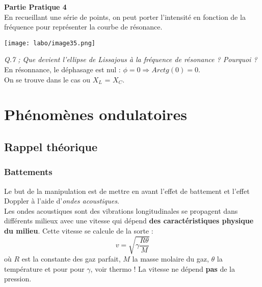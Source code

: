 \documentclass[british,french,11pt, a4paper, openany]{book}
\begin{document}
		\textbf{Partie Pratique 4}\\
		En recueillant une série de points, on peut porter l'intensité en fonction de la fréquence pour représenter la courbe de résonance.
		\begin{center}
			\texttt{[image: labo/image35.png]}
		\end{center}
		\textit{Q.7 ; Que devient l'ellipse de Lissajous à la fréquence de résonance ? Pourquoi ?}\\
		En résonnance, le déphasage est nul : $\phi = 0 \Rightarrow Arctg(0) = 0$.\\
		On se trouve dans le cas ou $X_L$ = $X_C$.
		
		
		
		
		
		
		
		
		
		
		
		
		
		\newpage
		\section{Phénomènes ondulatoires}
		\subsection{Rappel théorique}
		\subsubsection*{Battements}
		Le but de la manipulation est de mettre en avant l'effet de battement et l'effet Doppler à l'aide d'\textit{ondes acoustiques}.\\
		Les ondes acoustiques sont des vibrations longitudinales se propagent dans différents milieux avec une vitesse qui dépend \textbf{des caractéristiques physique du milieu}. Cette vitesse se calcule de la sorte : 
		\begin{equation}
			v = \sqrt{\gamma\frac{R\theta}{M}}
			\label{vitesse}
		\end{equation}
		où $R$ est la constante des gaz parfait, $M$ la masse molaire du gaz, $\theta$ la température et pour pour $\gamma$, voir thermo ! La vitesse ne dépend \textbf{pas} de la pression.\\
		
\end{document}
